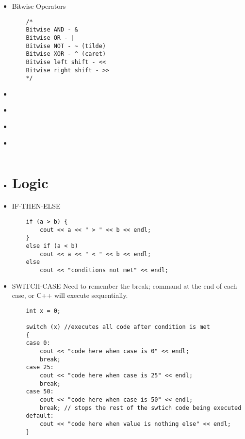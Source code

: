 \documentclass{article}
\begin{document}
\begin{itemize}
\item{Bitwise Operators}
\begin{lstlisting}
	/*
	Bitwise AND - &
	Bitwise OR - |
	Bitwise NOT - ~ (tilde)
	Bitwise XOR - ^ (caret)
	Bitwise left shift - << 
	Bitwise right shift - >>
	*/
\end{lstlisting}

\item{}
\begin{lstlisting}

\end{lstlisting}

\item{}
\begin{lstlisting}

\end{lstlisting}

\item{}
\begin{lstlisting}

\end{lstlisting}

\item{}
\begin{lstlisting}

\end{lstlisting}

\item{}
\begin{lstlisting}

\end{lstlisting}





\section{Logic}

\item{IF-THEN-ELSE}
\begin{lstlisting}
	if (a > b) {
		cout << a << " > " << b << endl;
	}
	else if (a < b)
		cout << a << " < " << b << endl;
	else
		cout << "conditions not met" << endl;

\end{lstlisting}

\item{SWITCH-CASE}
Need to remember the break; command at the end of each case, or C++ will execute sequentially.
\begin{lstlisting}
	int x = 0;
	
	switch (x) //executes all code after condition is met
	{
	case 0:
		cout << "code here when case is 0" << endl;
		break;
	case 25:
		cout << "code here when case is 25" << endl;
		break;
	case 50:
		cout << "code here when case is 50" << endl;
		break; // stops the rest of the swtich code being executed
	default:  
		cout << "code here when value is nothing else" << endl;
	}


\end{lstlisting}
\end{itemize}
\end{document}
